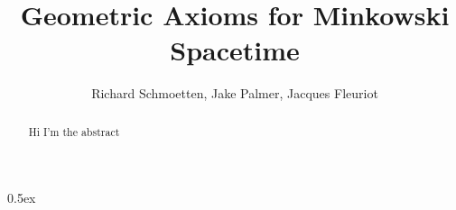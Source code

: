 \documentclass[11pt,a4paper]{article}
\begin{document}
\title{Geometric Axioms for Minkowski Spacetime}
\author{Richard Schmoetten, Jake Palmer, Jacques Fleuriot}
\maketitle
\begin{abstract}
Hi I'm the abstract
\end{abstract}

\tableofcontents\newpage

\parindent 0pt\parskip 0.5ex

%
\newpage
\newpage





\end{document}
